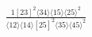 \documentclass[varwidth, border=5pt]{standalone}
\begin{document}
\begin{my}
$\begin{gathered}
\scriptscriptstyle\frac{1[23]^2⟨34⟩⟨15⟩⟨25⟩^2}{⟨12⟩⟨14⟩[25]^2⟨35⟩⟨45⟩^2}
\end{gathered}$
\end{my}
\end{document}
